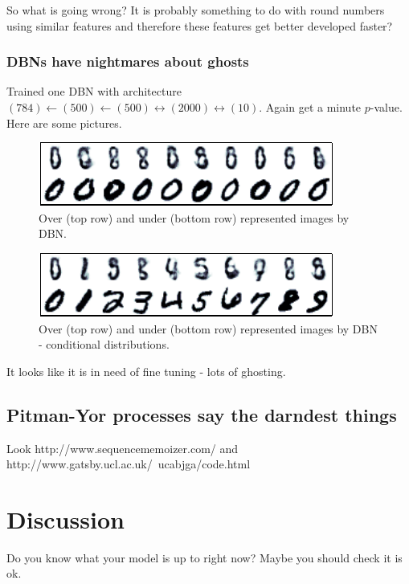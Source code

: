 \documentclass{article}
\begin{document}
So what is going wrong?
It is probably something to do with round numbers using similar features and therefore these features get better developed faster?

\subsubsection{DBNs have nightmares about ghosts}


Trained one DBN with architecture $(784)\leftarrow(500)\leftarrow(500)\leftrightarrow(2000)\leftrightarrow(10)$.
Again get a minute $p$-value.
Here are some pictures.

\begin{figure}[ht]
\centering
\includegraphics[width=0.98\columnwidth]{figures/dbn_over_under}
\caption{
Over (top row) and under (bottom row) represented images by DBN.
}
\label{fig:many_rbm_over_under}
\end{figure}

\begin{figure}[ht]
\centering
\includegraphics[width=0.98\columnwidth]{figures/dbn_over_under_digit}
\caption{
Over (top row) and under (bottom row) represented images by DBN - conditional distributions.
}
\label{fig:many_rbm_over_under_digit}
\end{figure}

It looks like it is in need of fine tuning - lots of ghosting.

\subsection{Pitman-Yor processes say the darndest things}

Look http://www.sequencememoizer.com/ and http://www.gatsby.ucl.ac.uk/~ucabjga/code.html

\section{Discussion}

Do you know what your model is up to right now?
Maybe you should check it is ok.



\end{document}
